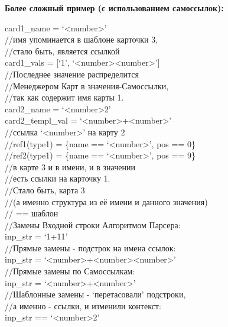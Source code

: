 \documentclass{book}
\newcommand{\less}{\textless}
\newcommand{\more}{\textgreater}
\begin{document}
\textbf{Более сложный пример (с использованием самоссылок):}

\begin{tcolorbox}[breakable]
card1\_name = `\less number\more' \\
//имя упоминается в шаблоне карточки 3, \\
//стало быть, является ссылкой \\
card1\_vals = [`1', `\less number\more\less number\more'] \\
//Последнее значение распределится \\
//Менеджером Карт в значения-Самоссылки, \\
//так как содержит имя карты 1. \\

card2\_name = `\less number\more*2' \\
card2\_templ\_val = `\less number\more+\less number\more' \\
//ссылка `\less number\more' на карту 2 \\
//ref1(type1) = \{name == `\less number\more', pos == 0\} \\
//ref2(type1) = \{name == `\less number\more', pos == 9\} \\
//в карте 3 и в имени, и в значении \\
//есть ссылки на карточку 1. \\
//Стало быть, карта 3 \\
//(а именно структура из её имени и данного значения) \\
// == шаблон \\

//Замены Входной строки Алгоритмом Парсера: \\
inp\_str = `1+11' \\

//Прямые замены - подстрок на имена ссылок: \\
inp\_str = `\less number\more+\less number\more\less number\more' \\
//Прямые замены по Самоссылкам: \\
inp\_str = `\less number\more+\less number\more' \\

//Шаблонные замены - `перетасовали' подстроки, \\ 
//а именно - ссылки, и изменили контекст: \\
inp\_str == `\less number\more*2' \\


\end{tcolorbox}
\end{document}
